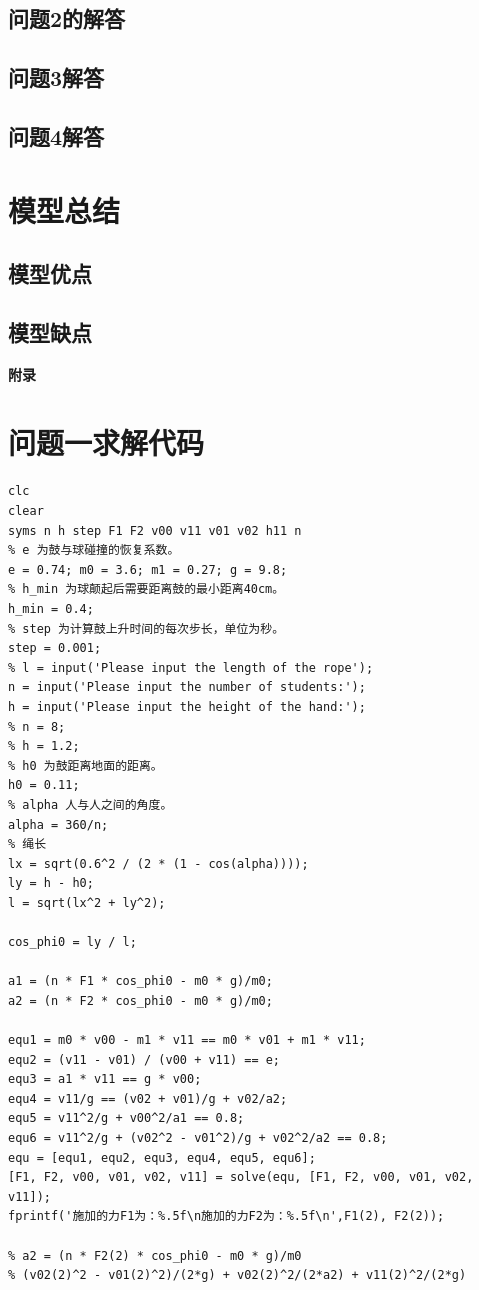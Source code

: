 \documentclass{cumcm}
\begin{document}
\subsection{问题2的解答}
\subsection{问题3解答}
\subsection{问题4解答}
\section{模型总结}

\subsection{模型优点}

\subsection{模型缺点}




\begin{thebibliography}{99}
\end{thebibliography}

\newpage
\appendix
\textbf{附录}
\section{问题一求解代码}
\begin{lstlisting}
clc
clear
syms n h step F1 F2 v00 v11 v01 v02 h11 n
% e 为鼓与球碰撞的恢复系数。
e = 0.74; m0 = 3.6; m1 = 0.27; g = 9.8; 
% h_min 为球颠起后需要距离鼓的最小距离40cm。
h_min = 0.4;
% step 为计算鼓上升时间的每次步长，单位为秒。
step = 0.001;
% l = input('Please input the length of the rope');
n = input('Please input the number of students:');
h = input('Please input the height of the hand:');
% n = 8; 
% h = 1.2;
% h0 为鼓距离地面的距离。
h0 = 0.11;
% alpha 人与人之间的角度。
alpha = 360/n;
% 绳长
lx = sqrt(0.6^2 / (2 * (1 - cos(alpha))));
ly = h - h0;
l = sqrt(lx^2 + ly^2);

cos_phi0 = ly / l;

a1 = (n * F1 * cos_phi0 - m0 * g)/m0;
a2 = (n * F2 * cos_phi0 - m0 * g)/m0;

equ1 = m0 * v00 - m1 * v11 == m0 * v01 + m1 * v11;
equ2 = (v11 - v01) / (v00 + v11) == e;
equ3 = a1 * v11 == g * v00;
equ4 = v11/g == (v02 + v01)/g + v02/a2;
equ5 = v11^2/g + v00^2/a1 == 0.8;
equ6 = v11^2/g + (v02^2 - v01^2)/g + v02^2/a2 == 0.8;
equ = [equ1, equ2, equ3, equ4, equ5, equ6];
[F1, F2, v00, v01, v02, v11] = solve(equ, [F1, F2, v00, v01, v02, v11]);
fprintf('施加的力F1为：%.5f\n施加的力F2为：%.5f\n',F1(2), F2(2));

% a2 = (n * F2(2) * cos_phi0 - m0 * g)/m0
% (v02(2)^2 - v01(2)^2)/(2*g) + v02(2)^2/(2*a2) + v11(2)^2/(2*g)
\end{lstlisting}
\end{document}

